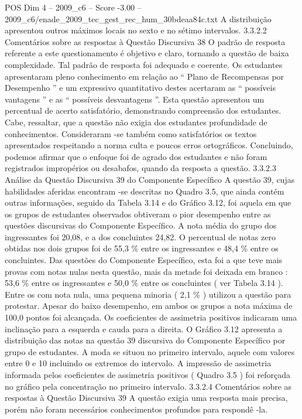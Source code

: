 \begin{textsample}{POS Dim 4 – 2009\_c6 – Score -3.00 – 2009\_c6/enade\_2009\_tec\_gest\_rec\_hum\_30bdeaa84c.txt}
A distribuição apresentou outros máximos locais no sexto e no sétimo intervalos. 3.3.2.2 Comentários sobre as respostas à Questão Discursiva 38 O padrão de resposta referente a este questionamento é objetivo e claro, tornando a questão de baixa complexidade.
Tal padrão de resposta foi adequado e coerente.
Os estudantes apresentaram pleno conhecimento em relação ao “ Plano de Recompensas por Desempenho ” e um expressivo quantitativo destes acertaram as “ possíveis vantagens ” e as “ possíveis desvantagens ”.
Esta questão apresentou um percentual de acerto satisfatório, demonstrando compreensão dos estudantes.
Cabe, ressaltar, que a questão não exigia dos estudantes profundidade de conhecimentos.
Consideraram -se também como satisfatórios os textos apresentados respeitando a norma culta e poucos erros ortográficos.
Concluindo, podemos afirmar que o enfoque foi de agrado dos estudantes e não foram registrados impropérios ou desabafos, quando da resposta a questão. 3.3.2.3 Análise da Questão Discursiva 39 do Componente Específico A questão 39, cujas habilidades aferidas encontram -se descritas no Quadro 3.5, que ainda contém outras informações, seguido da Tabela 3.14 e do Gráfico 3.12, foi aquela em que os grupos de estudantes observados obtiveram o pior desempenho entre as questões discursivas do Componente Específico.
A nota média do grupo dos ingressantes foi 20,08, e a dos concluintes 24,82.
O percentual de notas zero obtidas nos dois grupos foi de 55,3 \% entre os ingressantes e 48,4 \% entre os concluintes.
Das questões do Componente Específico, esta foi a que teve mais provas com notas nulas nesta questão, mais da metade foi deixada em branco : 53,6 \% entre os ingressantes e 50,0 \% entre os concluintes ( ver Tabela 3.14 ).
Entre os com nota nula, uma pequena minoria ( 2,1 \% ) utilizou a questão para protestar.
Apesar do baixo desempenho, em ambos os grupos a nota máxima de 100,0 pontos foi alcançada.
Os coeficientes de assimetria positivos indicaram uma inclinação para a esquerda e cauda para a direita.
O Gráfico 3.12 apresenta a distribuição das notas na questão 39 discursiva do Componente Específico por grupo de estudantes.
A moda se situou no primeiro intervalo, aquele com valores entre 0 e 10 incluindo os extremos do intervalo.
A impressão de assimetria informada pelos coeficientes de assimetria positivos ( Quadro 3.5 ) foi reforçada no gráfico pela concentração no primeiro intervalo. 3.3.2.4 Comentários sobre as respostas à Questão Discursiva 39 A questão exigia uma resposta mais precisa, porém não foram necessários conhecimentos profundos para respondê -la.

\end{textsample}
